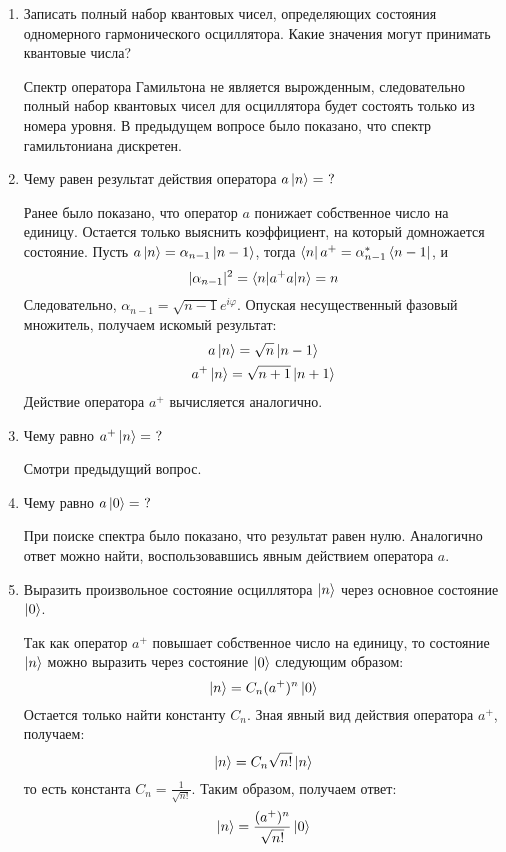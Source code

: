 \documentclass{article}
\begin{document}
\begin{enumerate}
	\item {Записать полный набор квантовых чисел, определяющих состояния одномерного гармонического осциллятора. Какие значения могут принимать квантовые числа?}
	
	Спектр оператора Гамильтона не является вырожденным, следовательно полный набор квантовых чисел для осциллятора будет состоять только из номера уровня. В предыдущем вопросе было показано, что спектр гамильтониана дискретен.
	
	\item {Чему равен результат действия оператора $a\ket{n} = \ ?$}
	
	Ранее было показано, что оператор $a$ понижает собственное число на единицу. Остается только выяснить коэффициент, на который домножается состояние. Пусть $a\ket{n} = \alpha_{n-1}\ket{n-1}$, тогда $\bra{n}a^+ = \alpha^*_{n-1}\bra{n-1}$, и
	\begin{equation}
		|\alpha_{n-1}|^2 = \braket{n|a^+a|n} = n
	\end{equation}
	Следовательно, $\alpha_{n-1} = \sqrt{n-1}e^{i\varphi}$. Опуская несущественный фазовый множитель, получаем искомый результат:
	\begin{gather}
		a\ket{n} = \sqrt{n}\ket{n-1} \\
		a^+\ket{n} = \sqrt{n+1} \ket{n+1}
	\end{gather}
	Действие оператора $a^+$ вычисляется аналогично.
	\item { Чему равно $a^+\ket{n} = \ ?$}
	
	Смотри предыдущий вопрос.
	\item {Чему равно $a\ket{0} = \ ?$}
	
	При поиске спектра было показано, что результат равен нулю. Аналогично ответ можно найти, воспользовавшись явным действием оператора $a$.
	\item {Выразить произвольное состояние осциллятора $\ket{n}$ через основное состояние $\ket{0}$.}
	
	Так как оператор $a^+$ повышает собственное число на единицу, то состояние $\ket{n}$ можно выразить через состояние $\ket{0}$ следующим образом:
	\begin{equation}
		\ket{n} = C_n (a^+)^n \ket{0}
	\end{equation}
	Остается только найти константу $C_n$. Зная явный вид действия оператора $a^+$, получаем:
	\begin{equation}
		\ket{n} = C_n \sqrt{n!}\ket{n}
	\end{equation}
	то есть константа $C_n = \frac{1}{\sqrt{n!}}$. Таким образом, получаем ответ:
	\begin{equation}
		\ket{n} = \frac{(a^+)^n}{\sqrt{n!}}\ket{0}
	\end{equation}
	

\end{enumerate}
\end{document}
